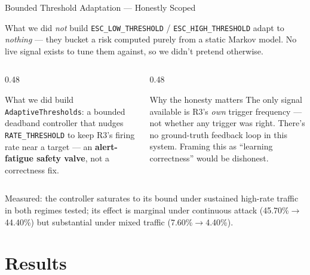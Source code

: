 \documentclass[aspectratio=169, 12pt]{beamer}
\begin{document}
\begin{frame}{Bounded Threshold Adaptation --- Honestly Scoped}
  \begin{alertblock}{What we did \emph{not} build}
    \texttt{ESC\_LOW\_THRESHOLD} / \texttt{ESC\_HIGH\_THRESHOLD} adapt to
    \emph{nothing} --- they bucket a risk computed purely from a static
    Markov model. No live signal exists to tune them against, so we
    didn't pretend otherwise.
  \end{alertblock}
  \vspace{0.3cm}
  \begin{columns}[T]
    \begin{column}{0.48\textwidth}
      \begin{block}{What we did build}
        \texttt{AdaptiveThresholds}: a bounded deadband controller that
        nudges \texttt{RATE\_THRESHOLD} to keep R3's firing rate near a
        target --- an \textbf{alert-fatigue safety valve}, not a
        correctness fix.
      \end{block}
    \end{column}
    \begin{column}{0.48\textwidth}
      \begin{exampleblock}{Why the honesty matters}
        The only signal available is R3's \emph{own} trigger frequency
        --- not whether any trigger was right. There's no ground-truth
        feedback loop in this system. Framing this as ``learning
        correctness'' would be dishonest.
      \end{exampleblock}
    \end{column}
  \end{columns}
  \vspace{0.2cm}
  \begin{center}
    \textcolor{honeyblue}{\small Measured: the controller saturates to its
    bound under sustained high-rate traffic in both regimes tested; its
    effect is marginal under continuous attack (45.70\%$\to$44.40\%) but
    substantial under mixed traffic (7.60\%$\to$4.40\%).}
  \end{center}
\end{frame}

\section{Results}
\end{document}
